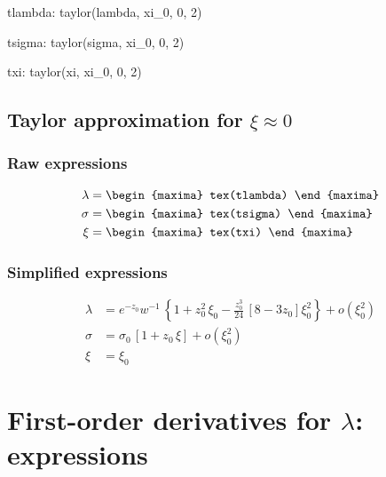 {\footnotesize
\begin{maxima}
  tlambda: taylor(lambda, xi_0, 0, 2)
\end{maxima}
\begin{maxima}
  tsigma: taylor(sigma, xi_0, 0, 2)
\end{maxima}
\begin{maxima}
  txi: taylor(xi, xi_0, 0, 2)
\end{maxima}
}

\subsection{Taylor approximation for $\xi \approx 0$}

\subsubsection*{Raw expressions}

{\footnotesize \color{MonVertF}
\begin{align*}
\lambda &= 
\begin{maxima}
  tex(tlambda)
\end{maxima} \\
\sigma &= 
\begin{maxima}
  tex(tsigma)
\end{maxima}\\
  \xi &= 
\begin{maxima}
  tex(txi)
\end{maxima}
\end{align*}
}

\subsubsection*{Simplified expressions}

{\color{red}
\begin{align*}
  \lambda &= e^{-z_0} w^{-1} \,  \left\{ 1 + z_0^2 \, \xi_0 -
            \frac{z_0^3}{24}\, \left[ 8 - 3 z_0 \right] \xi_0^2 \right\}
            + o(\xi_0^2)\\
  \sigma &= \sigma_0 \,  \left[ 1 + z_0 \, \xi  \right] + o(\xi_0^2)\\
  \xi &= \xi_0
\end{align*}
}



\section{First-order derivatives for $\lambda$: expressions}


